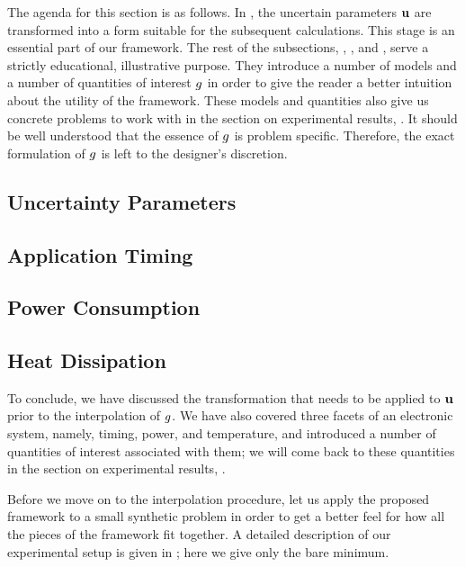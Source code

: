 The agenda for this section is as follows. In , the uncertain
parameters $\mathbf{u}$ are transformed into a form suitable for the subsequent
calculations. This stage is an essential part of our framework. The rest of the
subsections, , , and , serve a strictly
educational, illustrative purpose. They introduce a number of models and a
number of quantities of interest $g$ in order to give the reader a better
intuition about the utility of the framework. These models and quantities also
give us concrete problems to work with in the section on experimental results,
. It should be well understood that the essence of $g$ is
problem specific. Therefore, the exact formulation of $g$ is left to the
designer's discretion.

\subsection{Uncertainty Parameters} 



\subsection{Application Timing} 


\subsection{Power Consumption} 


\subsection{Heat Dissipation} 


To conclude, we have discussed the transformation that needs to be applied to
$\mathbf{u}$ prior to the interpolation of $g$. We have also covered three facets of
an electronic system, namely, timing, power, and temperature, and introduced a
number of quantities of interest associated with them; we will come back to
these quantities in the section on experimental results, .

Before we move on to the interpolation procedure, let us apply the proposed
framework to a small synthetic problem in order to get a better feel for how all
the pieces of the framework fit together. A detailed description of our
experimental setup is given in ; here we give only the bare
minimum.

